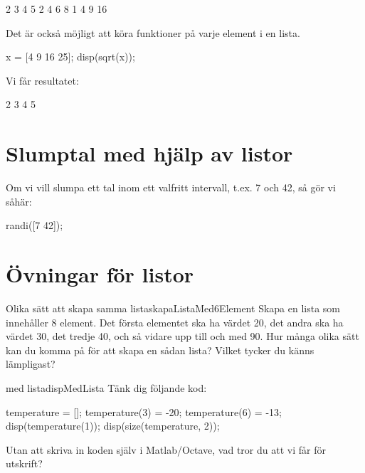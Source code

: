 \vspace{10pt}
\begin{matlab}
  2 3 4 5
  2 4 6 8
  1 4 9 16
\end{matlab}

\newpage
Det är också möjligt att köra funktioner på varje element i en lista.

\begin{matlab}[caption={Köra funktioner på varje element i en lista},label={}]
x = [4 9 16 25];
disp(sqrt(x));
\end{matlab}

Vi får resultatet:

\vspace{10pt}
\begin{matlab}
2 3 4 5
\end{matlab}

\section{Slumptal med hjälp av listor}\label{sec:listorslumptal}
Om vi vill slumpa ett tal inom ett valfritt intervall, t.ex. 7 och 42, så gör vi såhär:

\vspace{10pt}
\begin{matlab}
randi([7 42]); %
\end{matlab}


\section{Övningar för listor}

\begin{matteovning}{Olika sätt att skapa samma lista}{skapaListaMed6Element}
Skapa en lista som innehåller 8 element. Det första elementet ska ha värdet 20, det andra ska ha värdet 30, det tredje 40, och så vidare upp till och med 90. Hur många olika sätt kan du komma på för att skapa en sådan lista? Vilket tycker du känns lämpligast?
\end{matteovning}


\begin{matteovning}{ med lista}{dispMedLista}
Tänk dig följande kod:
\vspace{10pt}
\begin{matlab}
temperature = [];
temperature(3) = -20;
temperature(6) = -13;
disp(temperature(1));
disp(size(temperature, 2));
\end{matlab}
Utan att skriva in koden själv i Matlab/Octave, vad tror du att vi får för utskrift?
\end{matteovning}
